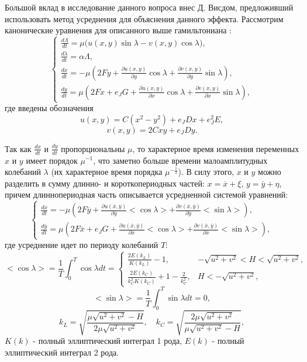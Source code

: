 Большой вклад в исследование данного вопроса внес Д. Висдом, предложивший использовать метод усреднения для объяснения данного эффекта. Рассмотрим канонические уравнения для описанного выше гамильтониана \cite{wis1}:
\begin{equation}
    \begin{cases}
        \frac{d \Lambda}{dt} = \mu \big( u(x,y) \sin \lambda - v(x,y) \cos \lambda \big), \\
        \frac{d \lambda}{dt} = \alpha \Lambda,\\
        \frac{dx}{dt} = -\mu \left(2Fy+\frac{\partial u(x,y)}{\partial y} \cos \lambda + \frac{\partial v(x,y)}{\partial y} \sin \lambda \right), \\
        \frac{dy}{dt} = \mu \left( 2Fx+e_JG +\frac{\partial u(x,y)}{\partial x} \cos \lambda + \frac{\partial v(x,y)}{\partial x} \sin \lambda \right),
    \end{cases}
    \label{sys2}
\end{equation}
где введены обозначения
$$u(x,y) = C(x^2-y^2)+e_J Dx +e_J^2E,$$
$$v(x,y) = 2Cxy+e_JDy.$$

Так как $\frac{dx}{dt}$ и $\frac{dy}{dt}$ пропорциональны $\mu$, то характерное время изменения переменных $x$ и $y$ имеет порядок $\mu^{-1}$, что заметно больше времени малоамплитудных колебаний $\lambda$ (их характерное время порядка $\mu^{-\frac12}$). В силу этого, $x$ и $y$ можно разделить в сумму длинно- и короткопериодных частей: $x=\overline x + \xi$, $y=\overline y + \eta$, причем длиннопериодная часть описывается усредненной системой уравнений:
\begin{equation}
    \begin{cases}
        \frac{d \overline x}{dt} = -\mu \left( 2F \overline y+\frac{\partial u(\overline x,\overline y)}{\partial \overline y} <\cos \lambda> + \frac{\partial v(\overline x,\overline y)}{\partial \overline y} <\sin \lambda> \right), \\
        \frac{d \overline y}{dt} = \mu \left( 2F \overline x+e_JG +\frac{\partial u(\overline x,\overline y)}{\partial \overline x} <\cos \lambda> + \frac{\partial v(\overline x,\overline y)}{\partial \overline x} <\sin \lambda> \right),
    \end{cases}
\end{equation}
где усреднение идет по периоду колебаний $T$:
$$<\cos \lambda>= \frac{1}{T} \int_0^T \cos \lambda dt = 
    \begin{cases} 
        \frac{2E(k_L)}{K(k_L)} - 1, &  -\sqrt{u^2+v^2} < H < \sqrt{u^2+v^2},\\
        \frac{2E(k_C)}{k_C^2 K(k_C)} + 1 - \frac{2}{k_C^2}, & H < -\sqrt{u^2+v^2},
    \end{cases}$$
$$<\sin \lambda>= \frac{1}{T} \int_0^T \sin \lambda dt = 0,$$
$$
k_L = \sqrt{\frac{\mu \sqrt{u^2+v^2} - H}{2 \mu \sqrt{u^2+v^2}}},\quad
k_C = \sqrt{\frac{2 \mu \sqrt{u^2+v^2}}{\mu \sqrt{u^2+v^2} - H}},
$$
$K(k)$ - полный эллиптический интеграл 1 рода,
$E(k)$ - полный эллиптический интеграл 2 рода.

